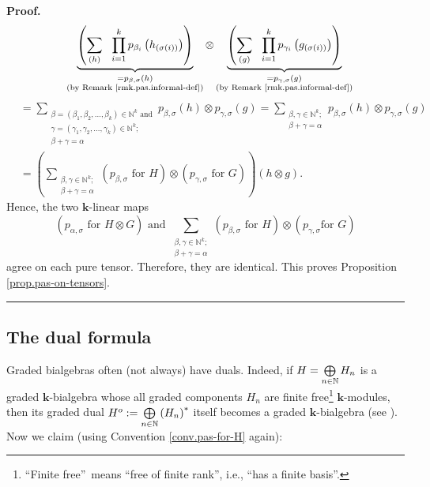 \documentclass[numbers=enddot,12pt,final,onecolumn,notitlepage]{scrartcl}%
\theoremstyle{definition}
\newenvironment{proof}[1][Proof]{\noindent\textbf{#1.} }{\ \rule{0.5em}{0.5em}}
\let\sumnonlimits\sum
\let\prodnonlimits\prod
\let\oplusnonlimits\bigoplus
\renewcommand{\sum}{\sumnonlimits\limits}
\renewcommand{\prod}{\prodnonlimits\limits}
\renewcommand{\bigoplus}{\oplusnonlimits\limits}
\begin{document}
\begin{proof}
\begin{align*}
{{}}\ \ \underbrace{\left(  \sum_{\left(  h\right)  }\ \ \prod_{i=1}^{k}%
p_{\beta_{i}}\left(  h_{\left(  \sigma\left(  i\right)  \right)  }\right)
\right)  }_{\substack{=p_{\beta,\sigma}\left(  h\right)  \\\text{(by Remark
\ref{rmk.pas.informal-def})}}}\otimes\underbrace{\left(  \sum_{\left(
g\right)  }\ \ \prod_{i=1}^{k}p_{\gamma_{i}}\left(  g_{\left(  \sigma\left(
i\right)  \right)  }\right)  \right)  }_{\substack{=p_{\gamma,\sigma}\left(
g\right)  \\\text{(by Remark \ref{rmk.pas.informal-def})}}}
\end{align*}%
\begin{align*}
&  =\sum_{\substack{\beta=\left(  \beta_{1},\beta_{2},\ldots,\beta_{k}\right)
\in\mathbb{N}^{k}\text{ and}\\\gamma=\left(  \gamma_{1},\gamma_{2}%
,\ldots,\gamma_{k}\right)  \in\mathbb{N}^{k};\\\beta+\gamma=\alpha}%
}p_{\beta,\sigma}\left(  h\right)  \otimes p_{\gamma,\sigma}\left(  g\right)
=\sum_{\substack{\beta,\gamma\in\mathbb{N}^{k};\\\beta+\gamma=\alpha}%
}p_{\beta,\sigma}\left(  h\right)  \otimes p_{\gamma,\sigma}\left(  g\right)
\\
&  =\left(  \sum_{\substack{\beta,\gamma\in\mathbb{N}^{k};\\\beta
+\gamma=\alpha}}\left(  p_{\beta,\sigma}\text{ for }H\right)  \otimes\left(
p_{\gamma,\sigma}\text{ for }G\right)  \right)  \left(  h\otimes g\right)  .
\end{align*}
Hence, the two $\mathbf{k}$-linear maps%
\[
\left(  p_{\alpha,\sigma}\text{ for }H\otimes G\right)  \text{ and }%
\sum_{\substack{\beta,\gamma\in\mathbb{N}^{k};\\\beta+\gamma=\alpha}}\left(
p_{\beta,\sigma}\text{ for }H\right)  \otimes\left(  p_{\gamma,\sigma}\text{
for }G\right)
\]
agree on each pure tensor. Therefore, they are identical. This proves
Proposition \ref{prop.pas-on-tensors}.
\end{proof}

\subsection{The dual formula}

Graded bialgebras often (not always) have duals. Indeed, if $H=\bigoplus
\limits_{n\in\mathbb{N}}H_{n}$ is a graded $\mathbf{k}$-bialgebra whose all
graded components $H_{n}$ are finite free\footnote{\textquotedblleft Finite
free\textquotedblright\ means \textquotedblleft free of finite
rank\textquotedblright, i.e., \textquotedblleft has a finite
basis\textquotedblright.} $\mathbf{k}$-modules, then its graded dual
$H^{o}:=\bigoplus\limits_{n\in\mathbb{N}}\left(  H_{n}\right)  ^{\ast}$ itself
becomes a graded $\mathbf{k}$-bialgebra (see \cite[\S 1.6]{GriRei}). Now we
claim (using Convention \ref{conv.pas-for-H} again):
\end{document}
